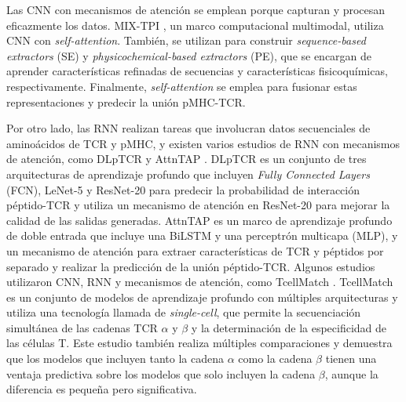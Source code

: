 Las CNN con mecanismos de atención se emplean porque capturan y procesan eficazmente los datos. MIX-TPI \citep{yang2023mix}, un marco computacional multimodal, utiliza CNN con \textit{self-attention}. También, se utilizan para construir \textit{sequence-based extractors} (SE) y \textit{physicochemical-based extractors} (PE), que se encargan de aprender características refinadas de secuencias y características fisicoquímicas, respectivamente. Finalmente,  \textit{self-attention} se emplea para fusionar estas representaciones y predecir la unión pMHC-TCR.

Por otro lado, las RNN realizan tareas que involucran datos secuenciales de aminoácidos de TCR y pMHC, y existen varios estudios de RNN con mecanismos de atención, como DLpTCR \citep{xu2021dlptcr} y AttnTAP \citep{xu2022attntap}. DLpTCR es un conjunto de tres arquitecturas de aprendizaje profundo que incluyen \textit{Fully Connected Layers} (FCN), LeNet-5 y ResNet-20 para predecir la probabilidad de interacción péptido-TCR y utiliza un mecanismo de atención en ResNet-20 para mejorar la calidad de las salidas generadas. AttnTAP es un marco de aprendizaje profundo de doble entrada que incluye una BiLSTM y una perceptrón multicapa (MLP), y un mecanismo de atención para extraer características de TCR y péptidos por separado y realizar la predicción de la unión péptido-TCR. Algunos estudios utilizaron CNN, RNN y mecanismos de atención, como TcellMatch \citep{fischer2020predicting}. TcellMatch es un conjunto de modelos de aprendizaje profundo con múltiples arquitecturas y utiliza una tecnología llamada de \textit{single-cell}, que permite la secuenciación simultánea de las cadenas TCR $\alpha$ y $\beta$ y la determinación de la especificidad de las células T. Este estudio también realiza múltiples comparaciones y demuestra que los modelos que incluyen tanto la cadena $\alpha$ como la cadena $\beta$ tienen una ventaja predictiva sobre los modelos que solo incluyen la cadena $\beta$, aunque la diferencia es pequeña pero significativa.

